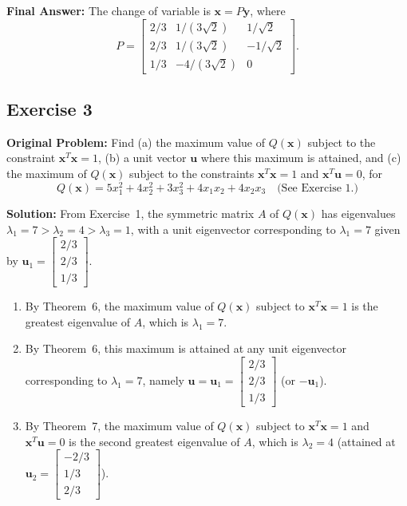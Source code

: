 \documentclass[11pt, letterpaper]{article}
\theoremstyle{definition}
\theoremstyle{remark}
\begin{document}
\textbf{Final Answer:} The change of variable is $\mathbf{x} = P\mathbf{y}$, where
\[
P = \begin{bmatrix} 2/3 & 1/(3\sqrt{2}) & 1/\sqrt{2} \\ 2/3 & 1/(3\sqrt{2}) & -1/\sqrt{2} \\ 1/3 & -4/(3\sqrt{2}) & 0 \end{bmatrix}.
\]

\subsection{Exercise 3}
\textbf{Original Problem:} Find (a) the maximum value of $Q(\mathbf{x})$ subject to the constraint $\mathbf{x}^T \mathbf{x} = 1$, (b) a unit vector $\mathbf{u}$ where this maximum is attained, and (c) the maximum of $Q(\mathbf{x})$ subject to the constraints $\mathbf{x}^T \mathbf{x} = 1$ and $\mathbf{x}^T \mathbf{u} = 0$, for
\[
Q(\mathbf{x}) = 5x_1^2 + 4x_2^2 + 3x_3^2 + 4x_1x_2 + 4x_2x_3 \quad \text{(See Exercise 1.)}
\]

\textbf{Solution:}
From Exercise~1, the symmetric matrix $A$ of $Q(\mathbf{x})$ has eigenvalues $\lambda_1 = 7 > \lambda_2 = 4 > \lambda_3 = 1$, with a unit eigenvector corresponding to $\lambda_1 = 7$ given by $\mathbf{u}_1 = \begin{bmatrix} 2/3 \\ 2/3 \\ 1/3 \end{bmatrix}$.
\begin{enumerate}[label=(\alph*)]
    \item By Theorem~6, the maximum value of $Q(\mathbf{x})$ subject to $\mathbf{x}^T \mathbf{x} = 1$ is the greatest eigenvalue of $A$, which is $\lambda_1 = 7$.
    \item By Theorem~6, this maximum is attained at any unit eigenvector corresponding to $\lambda_1 = 7$, namely $\mathbf{u} = \mathbf{u}_1 = \begin{bmatrix} 2/3 \\ 2/3 \\ 1/3 \end{bmatrix}$ (or $-\mathbf{u}_1$).
    \item By Theorem~7, the maximum value of $Q(\mathbf{x})$ subject to $\mathbf{x}^T \mathbf{x} = 1$ and $\mathbf{x}^T \mathbf{u} = 0$ is the second greatest eigenvalue of $A$, which is $\lambda_2 = 4$ (attained at $\mathbf{u}_2 = \begin{bmatrix} -2/3 \\ 1/3 \\ 2/3 \end{bmatrix}$).
\end{enumerate}
\end{document}
